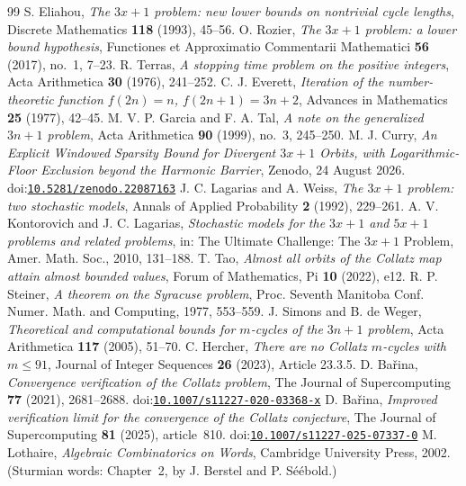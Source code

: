 \documentclass[11pt]{article}
\theoremstyle{plain}
\theoremstyle{definition}
\theoremstyle{remark}
\newcommand{\doi}[1]{\textsf{\footnotesize doi:}\href{https://doi.org/#1}{\texttt{\footnotesize #1}}}
\begin{document}
\begin{thebibliography}{99}
 S. Eliahou, \emph{The $3x+1$ problem: new lower bounds on nontrivial cycle
lengths}, Discrete Mathematics \textbf{118} (1993), 45--56.
 O. Rozier, \emph{The $3x+1$ problem: a lower bound hypothesis}, Functiones et
Approximatio Commentarii Mathematici \textbf{56} (2017), no.~1, 7--23.
 R. Terras, \emph{A stopping time problem on the positive integers}, Acta
Arithmetica \textbf{30} (1976), 241--252.
 C. J. Everett, \emph{Iteration of the number-theoretic function $f(2n)=n$,
$f(2n+1)=3n+2$}, Advances in Mathematics \textbf{25} (1977), 42--45.
 M. V. P. Garcia and F. A. Tal, \emph{A note on the generalized $3n+1$ problem},
Acta Arithmetica \textbf{90} (1999), no.~3, 245--250.
 M. J. Curry, \emph{An Explicit Windowed Sparsity Bound for Divergent $3x+1$ Orbits,
with Logarithmic-Floor Exclusion beyond the Harmonic Barrier}, Zenodo, 24 August 2026.
\doi{10.5281/zenodo.22087163}
 J. C. Lagarias and A. Weiss, \emph{The $3x+1$ problem: two stochastic
models}, Annals of Applied Probability \textbf{2} (1992), 229--261.
 A. V. Kontorovich and J. C. Lagarias, \emph{Stochastic models for the
$3x+1$ and $5x+1$ problems and related problems}, in: The Ultimate Challenge: The $3x+1$ Problem,
Amer. Math. Soc., 2010, 131--188.
 T. Tao, \emph{Almost all orbits of the Collatz map attain almost bounded values},
Forum of Mathematics, Pi \textbf{10} (2022), e12.
 R. P. Steiner, \emph{A theorem on the Syracuse problem}, Proc. Seventh Manitoba
Conf. Numer. Math. and Computing, 1977, 553--559.
 J. Simons and B. de Weger, \emph{Theoretical and computational bounds for
$m$-cycles of the $3n+1$ problem}, Acta Arithmetica \textbf{117} (2005), 51--70.
 C. Hercher, \emph{There are no Collatz $m$-cycles with $m\le91$}, Journal of
Integer Sequences \textbf{26} (2023), Article 23.3.5.
 D. Ba\v{r}ina, \emph{Convergence verification of the Collatz problem}, The
Journal of Supercomputing \textbf{77} (2021), 2681--2688. \doi{10.1007/s11227-020-03368-x}
 D. Ba\v{r}ina, \emph{Improved verification limit for the convergence of the
Collatz conjecture}, The Journal of Supercomputing \textbf{81} (2025), article~810.
\doi{10.1007/s11227-025-07337-0}
 M. Lothaire, \emph{Algebraic Combinatorics on Words}, Cambridge University
Press, 2002. (Sturmian words: Chapter~2, by J. Berstel and P. S\'e\'ebold.)

\end{thebibliography}
\end{document}
